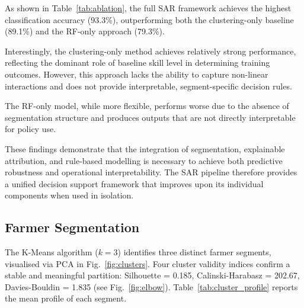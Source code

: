 \documentclass[3p,twocolumn,authoryear]{elsarticle}
\begin{document}
As shown in Table~\ref{tab:ablation}, the full SAR framework achieves the
highest classification accuracy (93.3\%), outperforming both the
clustering-only baseline (89.1\%) and the RF-only approach (79.3\%).

Interestingly, the clustering-only method achieves relatively strong
performance, reflecting the dominant role of baseline skill level in
determining training outcomes.
However, this approach lacks the ability to capture non-linear
interactions and does not provide interpretable, segment-specific
decision rules.

The RF-only model, while more flexible, performs worse due to the absence
of segmentation structure and produces outputs that are not directly
interpretable for policy use.

These findings demonstrate that the integration of segmentation,
explainable attribution, and rule-based modelling is necessary to
achieve both predictive robustness and operational interpretability.
The SAR pipeline therefore provides a unified decision support framework
that improves upon its individual components when used in isolation.

\begin{table}[htbp]
\centering
\caption{Ablation study comparing SAR with simplified baseline approaches}
\label{tab:ablation}


\end{table}

\subsection{Farmer Segmentation}

The K-Means algorithm ($k = 3$) identifies three distinct farmer segments,
visualised via PCA in Fig.~\ref{fig:clusters}.
Four cluster validity indices confirm a stable and meaningful partition:
Silhouette = 0.185, Calinski-Harabasz = 202.67, Davies-Bouldin = 1.835
(see Fig.~\ref{fig:elbow}).
Table~\ref{tab:cluster_profile} reports the mean profile of each segment.
\end{document}
